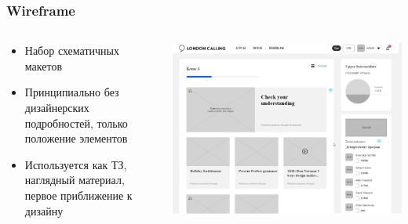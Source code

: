 \documentclass[xetex,mathserif,serif]{beamer}
\begin{document}
	\begin{frame}
		\frametitle{Wireframe}
		\begin{columns}
			\begin{column}{0.4\textwidth}
				\begin{itemize}
					\item Набор схематичных макетов
					\item Принципиально без дизайнерских подробностей, только положение элементов
					\item Используется как ТЗ, наглядный материал, первое приближение к дизайну
				\end{itemize}
			\end{column}
			\begin{column}{0.6\textwidth}
				\begin{center}
					\includegraphics[width=\textwidth]{wireframe.png}
				\end{center}
			\end{column}
		\end{columns}
	\end{frame}
\end{document}
